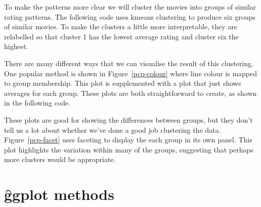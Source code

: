 {To make the patterns more clear we will cluster the movies into groups of similar rating patterns. The following code uses kmeans clustering \citep{hartigan:1979} to produce six groups of similar movies.  To make the clusters a little more interpretable, they are relabelled so that cluster 1 has the lowest average rating and cluster six the highest.

% 


There are many different ways that we can visualise the result of this clustering. One popular method is shown in Figure~\ref{pcp-colour} where line colour is mapped to group membership. This plot is supplemented with a plot that just shows averages for each group. These plots are both straightforward to create, as shown in the following code.

% 


These plots are good for showing the differences between groups, but they don't tell us a lot about whether we've done a good job clustering the data.  Figure~\ref{pcp-facet} uses faceting to display the each group in its own panel. This plot highlights the variation within many of the groups, suggesting that perhaps more clusters would be appropriate.

% 



\section{\f{ggplot} methods}
\label{sec:methods}

}
